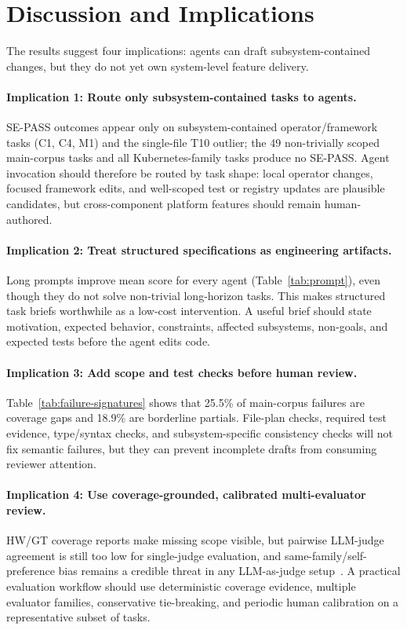 \section{Discussion and Implications}
\label{sec:discussion}
\label{sec:industrial-deployment}

The results suggest four implications: agents can draft subsystem-contained changes, but they do not yet own system-level feature delivery.

\paragraph{Implication 1: Route only subsystem-contained tasks to agents.}
SE-PASS outcomes appear only on subsystem-contained operator/framework tasks (C1, C4, M1) and the single-file T10 outlier; the 49 non-trivially scoped main-corpus tasks and all Kubernetes-family tasks produce no SE-PASS. Agent invocation should therefore be routed by task shape: local operator changes, focused framework edits, and well-scoped test or registry updates are plausible candidates, but cross-component platform features should remain human-authored.

\paragraph{Implication 2: Treat structured specifications as engineering artifacts.}
Long prompts improve mean score for every agent (Table~\ref{tab:prompt}), even though they do not solve non-trivial long-horizon tasks. This makes structured task briefs worthwhile as a low-cost intervention. A useful brief should state motivation, expected behavior, constraints, affected subsystems, non-goals, and expected tests before the agent edits code.

\paragraph{Implication 3: Add scope and test checks before human review.}
Table~\ref{tab:failure-signatures} shows that 25.5\% of main-corpus failures are coverage gaps and 18.9\% are borderline partials. File-plan checks, required test evidence, type/syntax checks, and subsystem-specific consistency checks will not fix semantic failures, but they can prevent incomplete drafts from consuming reviewer attention.

\paragraph{Implication 4: Use coverage-grounded, calibrated multi-evaluator review.}
HW/GT coverage reports make missing scope visible, but pairwise LLM-judge agreement is still too low for single-judge evaluation, and same-family/self-preference bias remains a credible threat in any LLM-as-judge setup~\cite{wataoka2024selfpreference}. A practical evaluation workflow should use deterministic coverage evidence, multiple evaluator families, conservative tie-breaking, and periodic human calibration on a representative subset of tasks.

